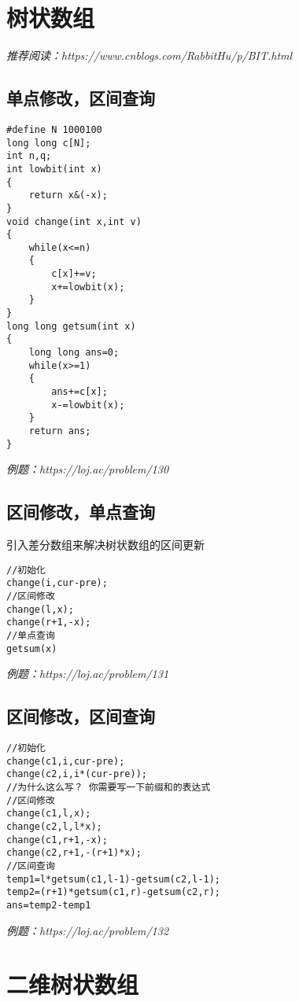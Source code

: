 \section{树状数组}
\emph{推荐阅读：https://www.cnblogs.com/RabbitHu/p/BIT.html}
\subsection{单点修改，区间查询}
\begin{lstlisting}
#define N 1000100
long long c[N];
int n,q;
int lowbit(int x)
{
    return x&(-x);
}
void change(int x,int v)
{
    while(x<=n)
    {
        c[x]+=v;
        x+=lowbit(x);
    }
}
long long getsum(int x)
{
    long long ans=0;
    while(x>=1)
    {
        ans+=c[x];
        x-=lowbit(x);
    }
    return ans;
}
\end{lstlisting}
\emph{例题：https://loj.ac/problem/130}

\subsection{区间修改，单点查询}
引入差分数组来解决树状数组的区间更新
\begin{lstlisting}
//初始化
change(i,cur-pre);
//区间修改
change(l,x);
change(r+1,-x);
//单点查询
getsum(x)
\end{lstlisting}
\emph{例题：https://loj.ac/problem/131}

\subsection{区间修改，区间查询}
\begin{lstlisting}
//初始化
change(c1,i,cur-pre);
change(c2,i,i*(cur-pre));
//为什么这么写？ 你需要写一下前缀和的表达式
//区间修改
change(c1,l,x);
change(c2,l,l*x);
change(c1,r+1,-x);
change(c2,r+1,-(r+1)*x);
//区间查询
temp1=l*getsum(c1,l-1)-getsum(c2,l-1);
temp2=(r+1)*getsum(c1,r)-getsum(c2,r);
ans=temp2-temp1
\end{lstlisting}
\emph{例题：https://loj.ac/problem/132}

\section{二维树状数组}
